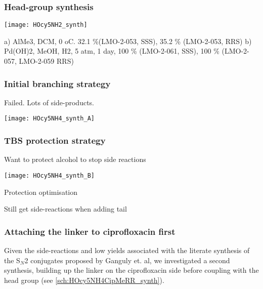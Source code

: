 \subsubsection{Head-group synthesis}

\begin{scheme}[H]
	\begin{center}
		\texttt{[image: HOcy5NH2\_synth]}
		\caption{a) AlMe3, DCM, 0 oC. 32.1 \%(LMO-2-053, SSS), 35.2 \% (LMO-2-053, RRS)
			b) Pd(OH)2, MeOH, H2, 5 atm, 1 day, 100 \% (LMO-2-061, SSS), 100 \% (LMO-2-057, LMO-2-059 RRS)\label{sch:}}
	\end{center}
\end{scheme}

\subsubsection{Initial branching strategy}

Failed. Lots of side-products.

\begin{scheme}[H]
	\begin{center}
		\texttt{[image: HOcy5NH4\_synth\_A]}
		\caption{\label{sch:}}
	\end{center}
\end{scheme}

\subsubsection{TBS protection strategy}

Want to protect alcohol to stop side reactions

\begin{scheme}[H]
	\begin{center}
		\texttt{[image: HOcy5NH4\_synth\_B]}
		\caption{\label{sch:}}
	\end{center}
\end{scheme}

Protection optimisation

Still get side-reactions when adding tail

\subsubsection{Attaching the linker to ciprofloxacin first}

Given the side-reactions and low yields associated with the literate synthesis of the S$_N$2 conjugates proposed by Ganguly et. al\cite{Ganguly2011}, we investigated a second synthesis, building up the linker on the ciprofloxacin side before coupling with the head group (see \ref{sch:HOcy5NH4CipMeRR_synth}).

